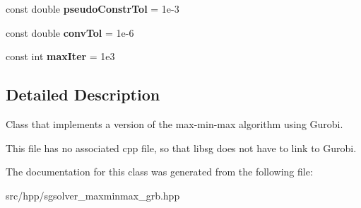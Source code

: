 \begin{DoxyCompactItemize}
const double {\bfseries pseudo\+Constr\+Tol} = 1e-\/3
\item 
\mbox{\label{classSGSolver__MaxMinMax__GRB_a255f1ab898f5dd561796767181e5e5f2}} 
const double {\bfseries conv\+Tol} = 1e-\/6
\item 
\mbox{\label{classSGSolver__MaxMinMax__GRB_ac0a8c214e860f98cfe23e7acb9d6e730}} 
const int {\bfseries max\+Iter} = 1e3
\end{DoxyCompactItemize}


\subsection{Detailed Description}
Class that implements a version of the max-\/min-\/max algorithm using Gurobi. 

This file has no associated cpp file, so that libsg does not have to link to Gurobi. 

The documentation for this class was generated from the following file\+:\begin{DoxyCompactItemize}
\item 
src/hpp/sgsolver\+\_\+maxminmax\+\_\+grb.\+hpp\end{DoxyCompactItemize}
